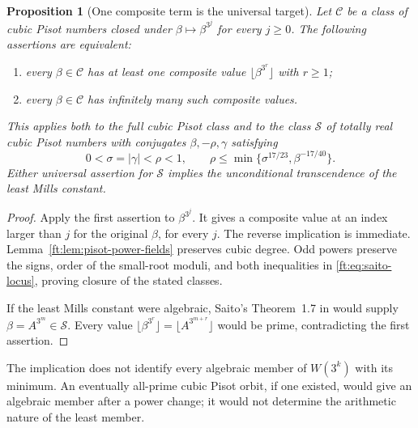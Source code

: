 \documentclass[11pt,a4paper]{article}
\newtheorem{proposition}[theorem]{Proposition}
\theoremstyle{definition}
\theoremstyle{remark}
\numberwithin{equation}{section}
\begin{document}
\begin{proposition}[One composite term is the universal target]
\label{ft:prop:one-composite}
Let $\mathcal C$ be a class of cubic Pisot numbers closed under
$\beta\mapsto\beta^{3^j}$ for every $j\ge0$. The following assertions
are equivalent:
\begin{enumerate}
\item every $\beta\in\mathcal C$ has at least one composite value
$\lfloor\beta^{3^r}\rfloor$ with $r\ge1$;
\item every $\beta\in\mathcal C$ has infinitely many such composite values.
\end{enumerate}
This applies both to the full cubic Pisot class and to the class
$\mathcal S$ of totally real cubic Pisot numbers with conjugates
$\beta,-\rho,\gamma$ satisfying
\begin{equation}
\label{ft:eq:saito-locus}
 0<\sigma=|\gamma|<\rho<1,
 \qquad \rho\le\min\{\sigma^{17/23},\beta^{-17/40}\}.
\end{equation}
Either universal assertion for $\mathcal S$ implies the unconditional
transcendence of the least Mills constant.
\end{proposition}
\begin{proof}
Apply the first assertion to $\beta^{3^j}$. It gives a composite
value at an index larger than $j$ for the original $\beta$, for every
$j$. The reverse implication is immediate.
Lemma~\ref{ft:lem:pisot-power-fields}
preserves cubic degree. Odd powers preserve the signs, order of the
small-root moduli, and both inequalities in
\eqref{ft:eq:saito-locus}, proving closure of the stated classes.

If the least Mills constant were algebraic, Saito's
Theorem~1.7 in \cite{SaitoVariants} would supply
$\beta=A^{3^m}\in\mathcal S$. Every value
$\lfloor\beta^{3^r}\rfloor=\lfloor A^{3^{m+r}}\rfloor$ would be
prime, contradicting the first assertion.
\end{proof}

The implication does not identify every algebraic member of $W(3^k)$
with its minimum. An eventually all-prime cubic Pisot orbit, if one
existed, would give an algebraic member after a power change; it would
not determine the arithmetic nature of the least member.
\end{document}
